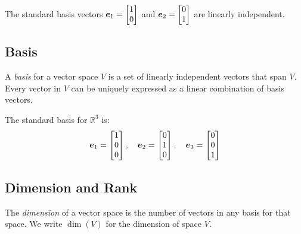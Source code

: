 \begin{example}
The standard basis vectors $\boldsymbol{e}_1 = \begin{bmatrix} 1 \\ 0 \end{bmatrix}$ and $\boldsymbol{e}_2 = \begin{bmatrix} 0 \\ 1 \end{bmatrix}$ are linearly independent.
\end{example}

\subsection{Basis}

\begin{definition}[Basis]
A \emph{basis} for a vector space $V$ is a set of linearly independent vectors that span $V$. Every vector in $V$ can be uniquely expressed as a linear combination of basis vectors.
\end{definition}

\begin{example}
The standard basis for $\mathbb{R}^3$ is:
\begin{equation}
    \boldsymbol{e}_1 = \begin{bmatrix} 1 \\ 0 \\ 0 \end{bmatrix}, \quad
    \boldsymbol{e}_2 = \begin{bmatrix} 0 \\ 1 \\ 0 \end{bmatrix}, \quad
    \boldsymbol{e}_3 = \begin{bmatrix} 0 \\ 0 \\ 1 \end{bmatrix}
\end{equation}
\end{example}

\subsection{Dimension and Rank}

\begin{definition}[Dimension]
The \emph{dimension} of a vector space is the number of vectors in any basis for that space. We write $\dim(V)$ for the dimension of space $V$.
\end{definition}

